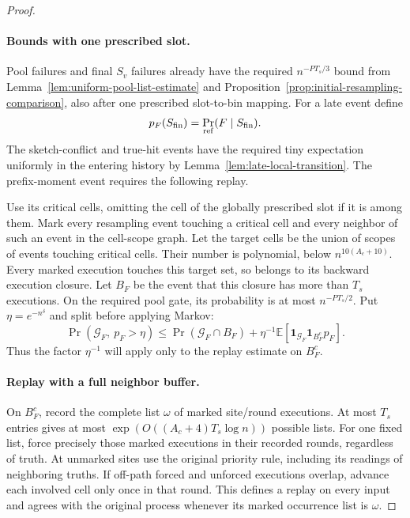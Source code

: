 \begin{proof}\leavevmode\par
\paragraph{Bounds with one prescribed slot.}
Pool failures and final \(S_v\) failures already have the required
\(n^{-PT_s/3}\) bound from Lemma~\ref{lem:uniform-pool-list-estimate}
and Proposition~\ref{prop:initial-resampling-comparison}, also after
one prescribed slot-to-bin mapping. For a late event define
\[
 p_F(S_{\rm fin})=\Pr_{\rm ref}(F\mid S_{\rm fin}).
\]
The sketch-conflict and true-hit events have the required tiny
expectation uniformly in the entering history by
Lemma~\ref{lem:late-local-transition}. The prefix-moment event
requires the following replay.

Use its critical cells, omitting the cell of the globally prescribed
slot if it is among them. Mark every resampling event touching a
critical cell and every neighbor of such an event in the cell-scope
graph. Let the target cells be the union of scopes of events touching
critical cells. Their number is polynomial, below
\(n^{10(A_c+10)}\). Every marked execution touches this target set,
so belongs to its backward execution closure. Let \(B_F\) be the
event that this closure has more than \(T_s\) executions. On the
required pool gate, its probability is at most \(n^{-PT_s/2}\).
Put \(\eta=e^{-n^\delta}\) and split before applying Markov:
\[
 \Pr(\mathcal G_F,\ p_F>\eta)
 \le \Pr(\mathcal G_F\cap B_F)
    +\eta^{-1}\mathbb E[
       \mathbf1_{\mathcal G_F}\mathbf1_{B_F^c}p_F].
\]
Thus the factor \(\eta^{-1}\) will apply only to the replay estimate
on \(B_F^c\).

\paragraph{Replay with a full neighbor buffer.}
On \(B_F^c\), record the complete list \(\omega\) of marked site/round
executions. At most \(T_s\) entries gives at most
\(\exp(O((A_c+4)T_s\log n))\) possible lists. For one fixed list,
force precisely those marked executions in their recorded rounds,
regardless of truth. At unmarked sites use the original priority rule,
including its readings of neighboring truths. If off-path forced and
unforced executions overlap, advance each involved cell only once
in that round. This defines a replay on every input and agrees with
the original process whenever its marked occurrence list is \(\omega\).


\end{proof}

